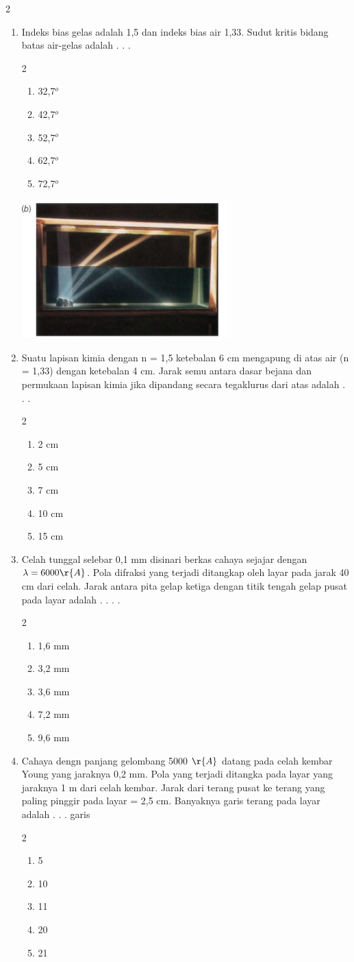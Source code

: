 \documentclass[11pt,a4paper]{extarticle}
\newcommand{\pilgani}[1]{                            \vspace{-0.3cm}\begin{multicols}{2}
 \begin{enumerate}[label=\Alph*., itemsep=0pt,topsep=0pt,leftmargin=*,align=Center]#1                     \end{enumerate}
 \phantom{ini cuma sapi, wedus, dan ayam}
 \end{multicols}}
\begin{document}
\begin{multicols*}{2}
\begin{enumerate}
\vspace{3cm}
\item Indeks bias gelas adalah 1,5 dan indeks bias air 1,33. Sudut kritis bidang batas air-gelas adalah . . .
\pilgani{
        \item 32,7$^o$
        \item 42,7$^o$
        \item 52,7$^o$
        \item 62,7$^o$
        \item 72,7$^o$
        }
\includegraphics[width=8cm]{pic/kritis}
\vspace{3cm}
\item Suatu lapisan kimia dengan n = 1,5 ketebalan 6 cm mengapung di atas air (n = 1,33) dengan ketebalan 4 cm. Jarak semu antara dasar bejana dan permukaan lapisan kimia jika dipandang secara tegaklurus dari atas adalah  . . . 
\pilgani{
        \item 2 cm
        \item 5 cm
        \item 7 cm
        \item 10 cm
        \item 15 cm
        }
\vspace{3cm}
\item Celah tunggal selebar 0,1 mm disinari berkas cahaya sejajar dengan $\lambda = 6000 \r{A}$. Pola difraksi yang terjadi ditangkap oleh layar pada jarak 40 cm dari celah. Jarak antara pita gelap ketiga dengan titik tengah gelap pusat pada layar adalah . . . .
\pilgani{
        \item 1,6 mm
        \item 3,2 mm
        \item 3,6 mm
        \item 7,2 mm
        \item 9,6 mm
        }

\vspace{3cm}
\item Cahaya dengn panjang gelombang 5000 $\r{A}$ datang pada celah kembar Young yang jaraknya 0,2 mm. Pola yang terjadi ditangka pada layar yang jaraknya 1 m dari celah kembar. Jarak dari terang pusat ke terang yang paling pinggir pada layar = 2,5 cm. Banyaknya garis terang pada layar adalah . . . garis
\pilgani{
        \item 5
        \item 10
        \item 11
        \item 20
        \item 21
        }


\end{enumerate}
\end{multicols*}
\end{document}
